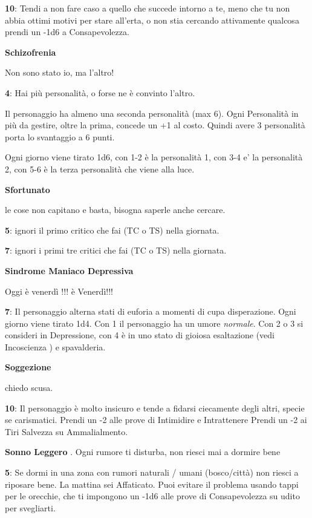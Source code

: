 \documentclass[a4paper,twoside,openany]{book}
\begin{document}
\begin{multicols}{2}
\textbf{10}: Tendi a non fare caso a quello che succede intorno a te, meno che tu non abbia ottimi motivi per stare all'erta, o non stia cercando attivamente qualcosa prendi un -1d6 a Consapevolezza.

\textbf{Schizofrenia}

Non sono stato io, ma l'altro!

\textbf{4}: Hai più personalità, o forse ne è convinto l'altro.

Il personaggio ha almeno una seconda personalità (max 6).
Ogni Personalità in più da gestire, oltre la prima, concede un +1 al costo.
Quindi avere 3 personalità porta lo svantaggio a 6 punti.

Ogni giorno viene tirato 1d6, con 1-2 è la personalità 1, con 3-4 e' la personalità 2, con 5-6 è la terza personalità che viene alla luce.

\textbf{Sfortunato}

le cose non capitano e basta, bisogna saperle anche cercare.

\textbf{5}: ignori il primo critico che fai (TC o TS) nella giornata.

\textbf{7}: ignori i primi tre critici che fai (TC o TS) nella giornata.

\textbf{Sindrome Maniaco Depressiva}

Oggi è venerdì !!! è Venerdì!!!

\textbf{7}: Il personaggio alterna stati di euforia a momenti di cupa disperazione. Ogni giorno viene tirato 1d4. Con 1 il personaggio ha un umore \emph{normale}. Con 2 o 3 si consideri in Depressione, con 4 è in uno stato di gioiosa esaltazione (vedi Incoscienza ) e spavalderia.

\textbf{Soggezione}

chiedo scusa.

\textbf{10}: Il personaggio è molto insicuro e tende a fidarsi ciecamente degli altri, specie se carismatici. Prendi un -2 alle prove di Intimidire e Intrattenere
Prendi un -2 ai Tiri Salvezza su Ammalialmento.

\textbf{Sonno Leggero}
.
Ogni rumore ti disturba, non riesci mai a dormire bene

\textbf{5}: Se dormi in una zona con rumori naturali / umani (bosco/città) non riesci a riposare bene. La mattina sei Affaticato. Puoi evitare il problema usando tappi per le orecchie, che ti impongono un -1d6 alle prove di Consapevolezza su udito per svegliarti.


\end{multicols}
\end{document}
